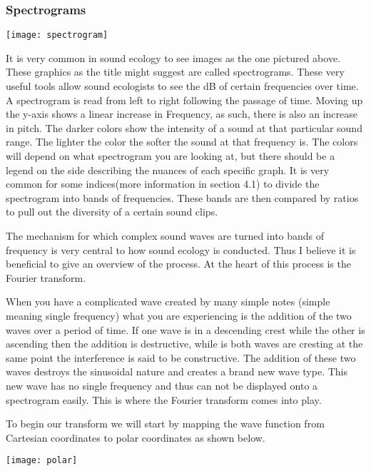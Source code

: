 \subsubsection{Spectrograms}
\begin{center}
  \texttt{[image: spectrogram]} \\[12pt]
\end{center}
It is very common in sound ecology to see images as the one pictured above. These graphics as the title might suggest are called spectrograms. These very useful tools allow sound ecologists to see the dB of certain frequencies over time. A spectrogram is read from left to right following the passage of time. Moving up the y-axis shows a linear increase in Frequency, as such, there is also an increase in pitch. The darker colors show the intensity of a sound at that particular sound range. The lighter the color the softer the sound at that frequency is. The colors will depend on what spectrogram you are looking at, but there should be a legend on the side describing the nuances of each specific graph. It is very common for some indices(more information in section 4.1) to divide the spectrogram into bands of frequencies. These bands are then compared by ratios to pull out the diversity of a certain sound clips.\par
The mechanism for which complex sound waves are turned into bands of frequency is very central to how sound ecology is conducted. Thus I believe it is beneficial to give an overview of the process. At the heart of this process is the Fourier transform.\par
When you have a complicated wave created by many simple notes (simple meaning single frequency) what you are experiencing is the addition of the two waves over a period of time. If one wave is in a descending crest while the other is ascending then the addition is destructive, while is both waves are cresting at the same point the interference is said to be constructive. The addition of these two waves destroys the sinusoidal nature and creates a brand new wave type. This new wave has no single frequency and thus can not be displayed onto a spectrogram easily. This is where the Fourier transform comes into play.\par
To begin our transform we will start by mapping the wave function from Cartesian coordinates to polar coordinates as shown below.
\begin{center}
  \texttt{[image: polar]} \\[12pt]
\end{center} \cite{bluebrown}
